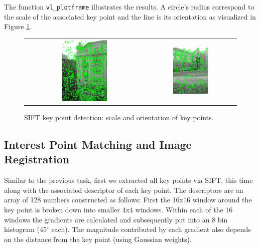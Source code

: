 The function \texttt{vl\_plotframe} illustrates the results. A circle's radius correspond to the scale of the associated key point and the line is its orientation as visualized in Figure \ref{fig:a4:vlplotframe}.

\begin{figure}[h]
	\centering
	\begin{tabular}{cc}
	\includegraphics[width=0.4\textwidth]{figures/vl_plotframe_officeview1.png} &
	\includegraphics[width=0.4\textwidth]{figures/vl_plotframe_campus4.png} 

	\end{tabular}
	\caption{SIFT key point detection: scale and orientation of key points.}
	\label{fig:a4:vlplotframe}
\end{figure}

\subsection{Interest Point Matching and Image Registration}

Similar to the previous task, first we extracted all key points via SIFT, this time along with the associated descriptor of each key point. The descriptors are an array of 128 numbers constructed as follows: First the 16x16 window around the key point is broken down into smaller 4x4 windows. Within each of the 16 windows the gradients are calculated and subsequently put into an 8 bin histogram (45$^\circ$ each). The magnitude contributed by each gradient also depends on the distance from the key point (using Gaussian weights). 

